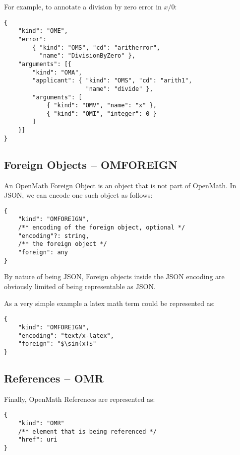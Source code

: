 For example, to annotate a division by zero error in $x/0$:
\\\begin{minipage}{\linewidth}
\begin{lstlisting}
{
    "kind": "OME",
    "error":
        { "kind": "OMS", "cd": "aritherror", 
          "name": "DivisionByZero" },
    "arguments": [{
        "kind": "OMA",
        "applicant": { "kind": "OMS", "cd": "arith1",
                       "name": "divide" },
        "arguments": [
            { "kind": "OMV", "name": "x" },
            { "kind": "OMI", "integer": 0 }
        ]
    }]
}
\end{lstlisting}\end{minipage}

\subsection{Foreign Objects -- OMFOREIGN}

An OpenMath Foreign Object is an object that is not part of OpenMath. 
In JSON, we can encode one such object as follows:
\\\begin{minipage}{\linewidth}
\begin{lstlisting}
{
    "kind": "OMFOREIGN",
    /** encoding of the foreign object, optional */
    "encoding"?: string,
    /** the foreign object */
    "foreign": any
}
\end{lstlisting}\end{minipage}

By nature of being JSON, Foreign objects inside the JSON encoding are obviously limited of being representable as JSON. 

As a very simple example a latex math term could be represented as:
\\\begin{minipage}{\linewidth}
\begin{lstlisting}
{
    "kind": "OMFOREIGN",
    "encoding": "text/x-latex",
    "foreign": "$\sin(x)$"
}
\end{lstlisting}\end{minipage}

\subsection{References -- OMR}

Finally, OpenMath References are represented as:
\\\begin{minipage}{\linewidth}
\begin{lstlisting}
{
    "kind": "OMR"
    /** element that is being referenced */
    "href": uri
}
\end{lstlisting}\end{minipage}

